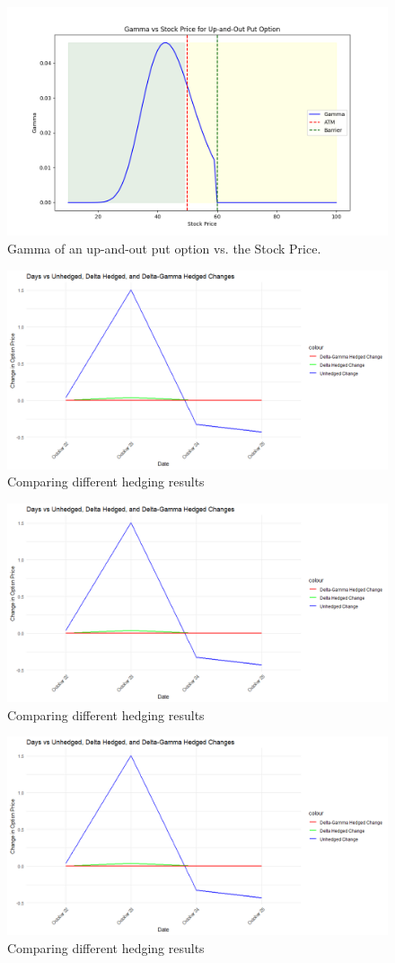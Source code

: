 \begin{figure}[h]
    \centering
    \includegraphics[width=.65\linewidth]{content/images/gamma.png}
    \caption{Gamma of an up-and-out put option vs. the Stock Price.}
    \label{fig:gamma_behavior}
\end{figure}

\begin{figure}[h]
    \centering
    \includegraphics[width=.65\linewidth]{content/images/compare_hedging.png}
    \caption{Comparing different hedging results}
    \label{fig:compare_deltagamma_hedge}
\end{figure}


\begin{figure}[h]
    \centering
    \includegraphics[width=.65\linewidth]{content/images/compare_hedging.png}
    \caption{Comparing different hedging results}
    \label{fig:compare_deltagamma_hedge}
\end{figure}


\begin{figure}[h]
	\centering
	\includegraphics[width=.65\linewidth]{content/images/compare_hedging.png}
	\caption{Comparing different hedging results}
	\label{fig:compare_deltagamma_hedge}
\end{figure}


